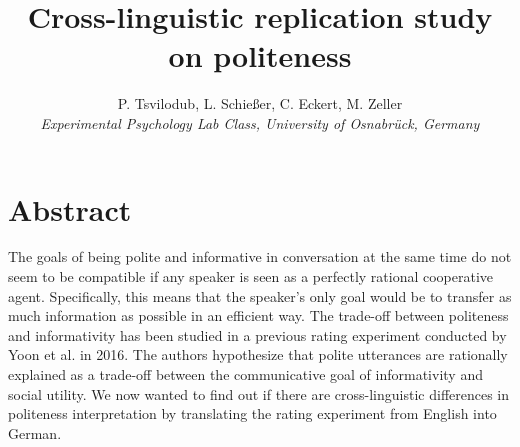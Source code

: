 \documentclass[a4paper,11pt]{article}
\title{Cross-linguistic replication study on politeness}
\author{P. Tsvilodub, L. Schießer, C. Eckert, M. Zeller 
\\ \textit{Experimental Psychology Lab Class, University of Osnabrück, Germany}}
\begin{document}
\maketitle

\section{Abstract}
The goals of being polite and informative in conversation at the same time do not seem to be compatible if any speaker is seen as a perfectly  rational cooperative agent. Specifically, this means that the speaker's only goal would be to transfer as much information as possible in an efficient way. The trade-off between politeness and informativity has been studied in a previous rating experiment conducted by Yoon et al. \cite{yoon2016talking} in 2016. The authors hypothesize that polite utterances are rationally explained as a trade-off between the communicative goal of informativity and social utility. We now wanted to find out if there are cross-linguistic differences in politeness interpretation by translating the rating experiment from English into German. 
\end{document}
